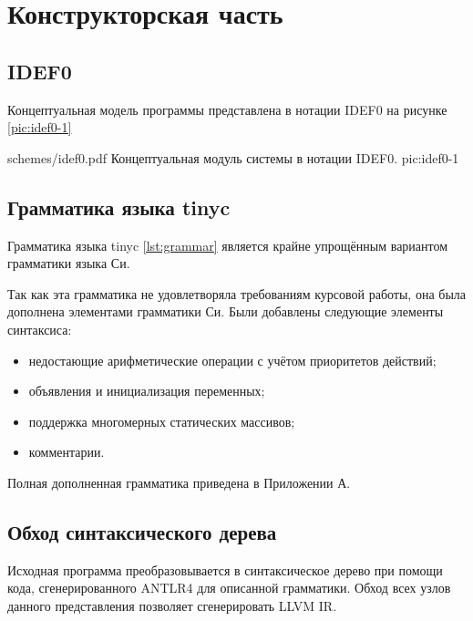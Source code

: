 \section{Конструкторская часть}

\subsection{IDEF0}
Концептуальная модель программы представлена в нотации IDEF0 на рисунке \ref{pic:idef0-1}

\myImage
{schemes/idef0.pdf}
{Концептуальная модуль системы в нотации IDEF0.}
{pic:idef0-1}


\subsection{Грамматика языка tinyc}
Грамматика языка tinyc \ref{lst:grammar} является крайне упрощённым вариантом грамматики языка Си.

\label{lst:grammar}

Так как эта грамматика не удовлетворяла требованиям курсовой работы, она была дополнена элементами грамматики Си. Были добавлены следующие элементы синтаксиса:
\begin{itemize}
    \item недостающие арифметические операции с учётом приоритетов действий;
    \item объявления и инициализация переменных;
    \item поддержка многомерных статических массивов;
    \item комментарии.
\end{itemize}
Полная дополненная грамматика приведена в Приложении А.

\subsection{Обход синтаксического дерева}
Исходная программа преобразовывается в синтаксическое дерево при помощи кода, сгенерированного ANTLR4 для описанной грамматики. Обход всех узлов данного представления позволяет сгенерировать LLVM IR.

